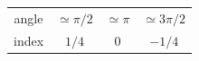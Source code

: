 \begin{table}[!h]
\centering
\begin{tabular}{|c|c|c|c|}
\hline
\multirow{2}{*}{angle} & \multirow{2}{*}{$\simeq\pi/2$} & \multirow{2}{*}{$\simeq\pi$} & \multirow{2}{*}{$\simeq3\pi/2$} \\
&&&\\
\hline
\multirow{2}{*}{index} & \multirow{2}{*}{$1/4$}   & \multirow{2}{*}{$0$}   & \multirow{2}{*}{$-1/4$}\\

\end{tabular}
\end{table}
